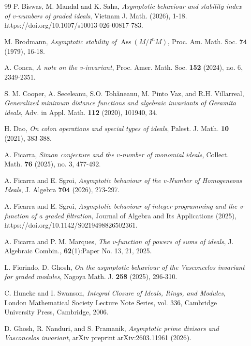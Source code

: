 \documentclass[11pt,reqno]{amsart}
\theoremstyle{definition}
\newcommand{\Ass}{\operatorname{Ass}}
\begin{document}

 \begin{thebibliography}{99}
 P. Biswas, M. Mandal and K. Saha, \emph{Asymptotic behaviour and stability index of v-numbers of graded ideals}, Vietnam J. Math. (2026), 1-18. https://doi.org/10.1007/s10013-026-00817-783.
 
 M. Brodmann, \emph{Asymptotic stability of $\Ass(M/I^nM)$}, Proc. Am. Math. Soc. \textbf{74} (1979), 16-18.

 A. Conca, \emph{A note on the v-invariant}, Proc. Amer. Math. Soc. \textbf{152} (2024), no. 6, 2349-2351.
 
S. M. Cooper, A. Seceleanu, S.O. Toh\v{a}neanu, M. Pinto Vaz, and R.H. Villarreal, \emph{Generalized minimum distance functions and algebraic invariants of Geramita ideals}, Adv. in Appl. Math. \textbf{112} (2020), 101940, 34.

H. Dao, \emph{On colon operations and special types of ideals}, Palest. J. Math. \textbf{10} (2021), 383-388.

A. Ficarra, 
\emph{Simon conjecture and the $v$-number of monomial ideals}, Collect. Math. \textbf{76} (2025), no. 3, 477-492.

A. Ficarra and E. Sgroi, \emph{Asymptotic behaviour of the v-Number of Homogeneous Ideals}, J. Algebra \textbf{704} (2026), 273-297.

A. Ficarra and E. Sgroi, \emph{Asymptotic behaviour of integer programming and the v-function of a graded ﬁltration}, Journal of Algebra and Its Applications (2025), https://doi.org/10.1142/S0219498826502361.

A. Ficarra and P. M. Marques, \emph{The v-function of powers of sums of ideals}, J.
Algebraic Combin., \textbf{62}(1):Paper No. 13, 21, 2025. 

L. Fiorindo, D. Ghosh, \emph{On the asymptotic behaviour of the Vasconcelos invariant for graded modules}, Nagoya
Math. J. \textbf{258} (2025), 296-310. 

C. Huneke and I. Swanson, \emph{Integral Closure of Ideals, Rings, and Modules}, London Mathematical Society Lecture Note Series, vol. 336, Cambridge University Press, Cambridge, 2006.

D. Ghosh, R. Nanduri, and S. Pramanik, \emph{Asymptotic prime divisors and Vasconcelos invariant}, arXiv preprint arXiv:2603.11961 (2026).


\end{thebibliography}
\end{document}
